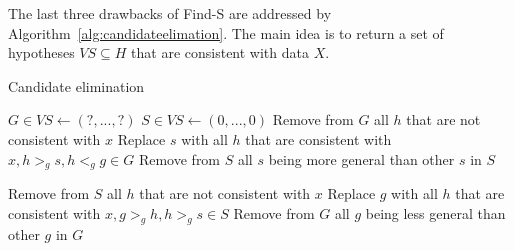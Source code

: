 \documentclass{report}
\begin{document}
The last three drawbacks of Find-S are addressed by Algorithm~\ref{alg:candidateelimation}. The main idea is to return a set of hypotheses $VS\subseteq H$ that are consistent with data $X$.

\begin{algorithm}
\caption{Candidate elimination}
\label{alg:candidateelimation}
\begin{algorithmic}
\State $G\in VS \gets (?,...,?)$ 
\State $S\in VS \gets (0,...,0)$ 
\State Remove from $G$ all $h$ that are not consistent with $x$
\State Replace $s$ with all $h$ that are consistent with $x, h>_g s, h<_g g\in G$
\State Remove from $S$ all $s$ being more general than other $s$ in $S$
\EndFor
\EndIf

\State Remove from $S$ all $h$ that are not consistent with $x$
\State Replace $g$ with all $h$ that are consistent with $x, g>_g h, h>_g s\in S$
\State Remove from $G$ all $g$ being less general than other $g$ in $G$
\EndFor
\EndIf
\EndFor
\\
\end{algorithmic}
\end{algorithm}
\end{document}
